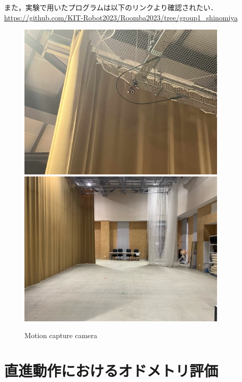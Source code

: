 \documentclass[a4paper,11pt]{jsarticle}
\begin{document}
また，実験で用いたプログラムは以下のリンクより確認されたい．\\
\href{https://github.com/KIT-Robot2023/Roomba2023/tree/group1_shinomiya}{https://github.com/KIT-Robot2023/Roomba2023/tree/group1\_shinomiya}



\begin{figure}[H]\centering
  \includegraphics[width=100mm]{figure/IMG_3299.jpg}
  \includegraphics[width=100mm]{figure/Flight_space.jpg}
\caption{Motion capture camera}\label{cam}\end{figure}

\newpage

\section{直進動作におけるオドメトリ評価}\label{ex1}
\end{document}
